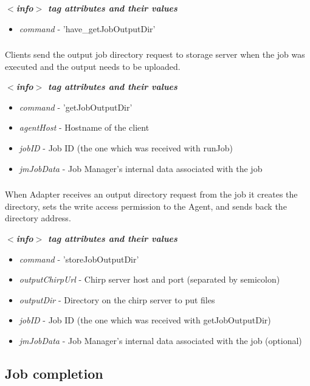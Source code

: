 \emph{\bf $<$info$>$ tag attributes and their values}
\begin{itemize}
  \item \emph{command} - 'have\_getJobOutputDir'
 \end{itemize}

\subsubsection{}
\label{sct:getjoboutputdir}
Clients send the output job directory request to storage server when the job was executed and the output needs to be uploaded.

\emph{\bf $<$info$>$ tag attributes and their values}
\begin{itemize}
  \item \emph{command} - 'getJobOutputDir'
  \item \emph{agentHost} - Hostname of the client
  \item \emph{jobID} - Job ID (the one which was received with runJob)
  \item \emph{jmJobData} - Job Manager's internal data associated with the job
\end{itemize}

\subsubsection{}
\label{sct:storejoboutputdir}
When Adapter receives an output directory request from the job it creates the directory, sets the write access permission to the Agent, and sends back the directory address.

\emph{\bf $<$info$>$ tag attributes and their values}
\begin{itemize}
  \item \emph{command} - 'storeJobOutputDir'
  \item \emph{outputChirpUrl} - Chirp server host and port (separated by semicolon)
  \item \emph{outputDir} - Directory on the chirp server to put files
  \item \emph{jobID} - Job ID (the one which was received with getJobOutputDir)
  \item \emph{jmJobData} - Job Manager's internal data associated with the job (optional)
\end{itemize}

\subsection{Job completion}
